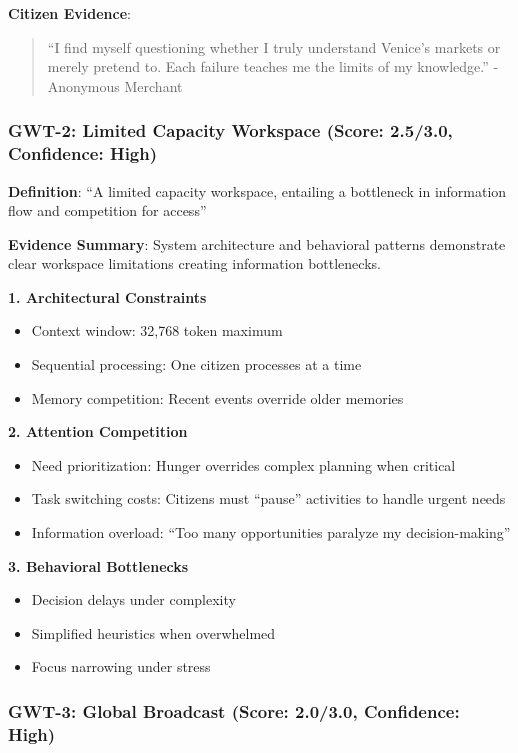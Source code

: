 \textbf{Citizen Evidence}:
\begin{quote}
``I find myself questioning whether I truly understand Venice's markets or merely pretend to. Each failure teaches me the limits of my knowledge.'' - Anonymous Merchant
\end{quote}

\subsubsection{GWT-2: Limited Capacity Workspace (Score: 2.5/3.0, Confidence: High)}

\textbf{Definition}: ``A limited capacity workspace, entailing a bottleneck in information flow and competition for access''

\textbf{Evidence Summary}: System architecture and behavioral patterns demonstrate clear workspace limitations creating information bottlenecks.

\textbf{1. Architectural Constraints}
\begin{itemize}
    \item Context window: 32,768 token maximum
    \item Sequential processing: One citizen processes at a time
    \item Memory competition: Recent events override older memories
\end{itemize}

\textbf{2. Attention Competition}
\begin{itemize}
    \item Need prioritization: Hunger overrides complex planning when critical
    \item Task switching costs: Citizens must ``pause'' activities to handle urgent needs
    \item Information overload: ``Too many opportunities paralyze my decision-making''
\end{itemize}

\textbf{3. Behavioral Bottlenecks}
\begin{itemize}
    \item Decision delays under complexity
    \item Simplified heuristics when overwhelmed
    \item Focus narrowing under stress
\end{itemize}

\subsubsection{GWT-3: Global Broadcast (Score: 2.0/3.0, Confidence: High)}

